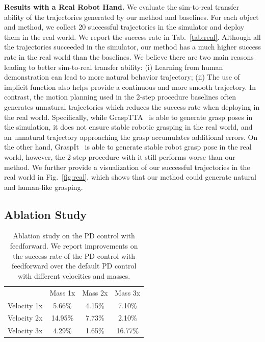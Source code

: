 \documentclass[letterpaper, 10 pt, journal, twoside]{IEEEtran}
\newcommand{\tablestyle}[2]{\setlength{\tabcolsep}{#1}\renewcommand{\arraystretch}{#2}\centering\footnotesize}
\begin{document}
\textbf{Results with a Real Robot Hand.}  We evaluate the sim-to-real transfer ability of the trajectories generated by our method and baselines. For each object and method, we collect 20 successful trajectories in the simulator and deploy them in the real world. We report the success rate in Tab.~\ref{tab:real}. Although all the trajectories succeeded in the simulator, our method has a much higher success rate in the real world than the baselines. We believe there are two main reasons leading to better sim-to-real transfer ability: (i) Learning from human demonstration can lead to more natural behavior trajectory; (ii) The use of implicit function also helps provide a continuous and more smooth trajectory. In contrast, the motion planning used in the 2-step procedure baselines often generates unnatural trajectories which reduces the success rate when deploying in the real world. Specifically, while GraspTTA~\cite{jiang2021hand} is able to generate grasp poses in the simulation, it does not ensure stable robotic grasping in the real world, and an unnatural trajectory approaching the grasp accumulates additional errors. On the other hand, GraspIt~\cite{miller2004graspit} is able to generate stable robot grasp pose in the real world, however, the 2-step procedure with it still performs worse than our method. We further provide a visualization of our successful trajectories in the real world in Fig.~\ref{fig:real}, which shows that our method could generate natural and human-like grasping.



\vspace{-0.1in}
\subsection{Ablation Study}
\vspace{-0.05in}

\begin{table}[t]
\tiny
\centering
\tablestyle{1.5pt}{1.05}
\begin{tabular}{l|ccc}
     & Mass 1x & Mass 2x  & Mass 3x \\
    \shline
    Velocity 1x & 5.66\% & 4.15\% & 7.10\%  \\
    Velocity 2x &  14.95\% & 7.73\%  & 2.10\%\\
    Velocity 3x & 4.29\% & 1.65\%  & 16.77\%  \\
\end{tabular}
\vspace{-0.1in}
\caption{\small
Ablation study on the PD control with feedforward. We report improvements on the success rate of the PD control with feedforward over the default PD control with different velocities and masses.}
\vspace{-0.15in}
\label{tab:augpd}
\end{table}
\end{document}
